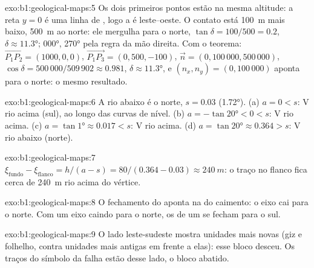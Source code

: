 \begin{solution}{exo:b1:geological-maps:5}
Os dois primeiros pontos estão na mesma altitude: a reta $y = 0$ é uma linha de , logo a  é leste--oeste. O contato está \qty{100}{m} mais baixo,
\qty{500}{m} ao norte: ele mergulha para o norte, $\tan\delta = 100/500 = 0.2$,
$\delta \approx \ang{11.3}$;  \ang{000},  \ang{270} pela regra da mão direita. Com o teorema: $\overrightarrow{P_1P_2} = (1000, 0, 0)$,
$\overrightarrow{P_1P_3} = (0, 500, -100)$, $\vec n = (0, 100\,000,
500\,000)$, $\cos\delta = 500\,000/509\,902 \approx 0.981$, $\delta \approx
\ang{11.3}$, e $(n_x, n_y) = (0, 100\,000)$ aponta para o norte: o mesmo resultado.
\end{solution}

\begin{solution}{exo:b1:geological-maps:6}
A  rio abaixo é o norte, $s = 0.03$ (\ang{1.72}). (a) $a = 0 < s$: V rio acima (sul), ao longo das curvas de nível. (b) $a = -\tan\ang{20} < 0 < s$: V rio acima.
(c) $a = \tan\ang{1} \approx 0.017 < s$: V rio acima. (d) $a = \tan\ang{20}
\approx 0.364 > s$: V rio abaixo (norte).
\end{solution}

\begin{solution}{exo:b1:geological-maps:7}
$\xi_{\text{fundo}} - \xi_{\text{flanco}} = h/(a - s) = 80/(0.364 - 0.03)
\approx \qty{240}{m}$: o traço no flanco fica cerca de \qty{240}{m} rio acima do vértice.
\end{solution}

\begin{solution}{exo:b1:geological-maps:8}
O fechamento do  aponta na  do caimento: o eixo cai para o norte. Com um eixo caindo para o norte, os  de um  se fecham para o sul.
\end{solution}

\begin{solution}{exo:b1:geological-maps:9}
O lado leste-sudeste mostra unidades mais novas (giz e folhelho, contra unidades mais antigas em frente a elas): esse bloco desceu. Os traços do símbolo da falha estão desse lado, o bloco abatido.
\end{solution}

